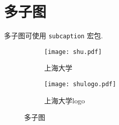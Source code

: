 \section{多子图}
多子图可使用 \texttt{subcaption} 宏包.
\begin{figure}[!htbp]
  \setlength{\abovecaptionskip}{12bp}
  \centering
  \begin{subfigure}{0.48\linewidth}
    \centering
    \texttt{[image: shu.pdf]}
    \caption{上海大学}
  \end{subfigure}
  \hfill
  \begin{subfigure}{0.48\linewidth}
    \centering
    \texttt{[image: shulogo.pdf]}
    \caption{上海大学logo}
  \end{subfigure}
  \caption{多子图}
\end{figure}
